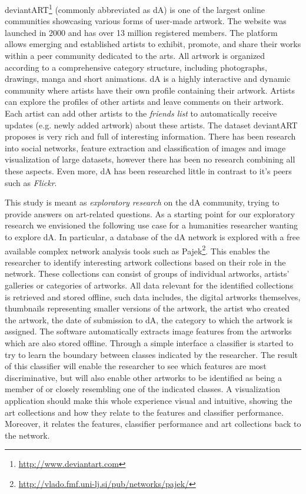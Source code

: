 deviantART\footnote{\url{http://www.deviantart.com}} (commonly abbreviated as dA) is one of the largest online communities showcasing various forms of user-made artwork.
The website was launched in 2000 and has over 13 million registered members.
The platform allows emerging and established artists to exhibit, promote, and share their works within a peer community dedicated to the arts. 
All artwork is organized according to a comprehensive category structure, including photographs, drawings, manga and short animations.
dA is a highly interactive and dynamic community where artists have their own profile containing their artwork.
Artists can explore the profiles of other artists and leave comments on their artwork.
Each artist can add other artists to the \textit{friends list} to automatically receive updates (e.g. newly added artwork) about these artists.
The dataset deviantART proposes is very rich and full of interesting information. 
There has been research into social networks, feature extraction and classification of images and image visualization of large datasets, however there has been no research combining all these aspects. Even more, dA has been researched little in contrast to it's peers such as \textit{Flickr}.

This study is meant as \textit{exploratory research} on the dA community, trying to provide answers on art-related questions.
As a starting point for our exploratory research we envisioned the following use case for a humanities researcher wanting to explore dA. In particular, a database of the dA network is explored with a free available complex network analysis tools such as Pajek\footnote{\url{http://vlado.fmf.uni-lj.si/pub/networks/pajek/}}. This enables the researcher to identify interesting artwork collections based on their role in the network. These collections can consist of groups of individual artworks, artists' galleries or categories of artworks.  All data relevant for the identified collections is retrieved and stored offline, such data includes, the digital artworks themselves, thumbnails representing smaller versions of the artwork, the artist who created the artwork, the date of submission to dA, the category to which the artwork is assigned. The software automatically extracts image features from the artworks which are also stored offline. Through a simple interface a classifier is started to try to learn the boundary between classes indicated by the researcher. The result of this classifier will enable the researcher to see which features are most discriminative, but will also enable other artworks to be identified as being a member of or closely resembling one of the indicated classes. A visualization application should make this whole experience visual and intuitive, showing the art collections and how they relate to the features and classifier performance. Moreover, it relates the features, classifier performance and art collections back to the network.

